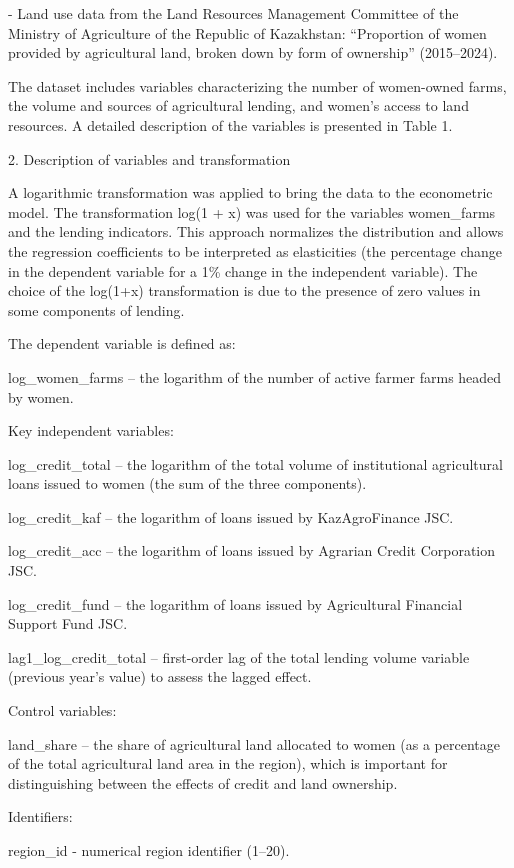 \documentclass[
]{article}
\begin{document}
- Land use data from the Land Resources Management Committee of the
Ministry of Agriculture of the Republic of Kazakhstan: ``Proportion of
women provided by agricultural land, broken down by form of ownership''
(2015--2024).

The dataset includes variables characterizing the number of women-owned
farms, the volume and sources of agricultural lending, and women's
access to land resources. A detailed description of the variables is
presented in Table 1.

2. Description of variables and transformation

A logarithmic transformation was applied to bring the data to the
econometric model. The transformation log(1 + x) was used for the
variables women\_farms and the lending indicators. This approach
normalizes the distribution and allows the regression coefficients to be
interpreted as elasticities (the percentage change in the dependent
variable for a 1\% change in the independent variable). The choice of
the log(1+x) transformation is due to the presence of zero values in
some components of lending.

The dependent variable is defined as:

log\_women\_farms -- the logarithm of the number of active farmer farms
headed by women.

Key independent variables:

log\_credit\_total -- the logarithm of the total volume of institutional
agricultural loans issued to women (the sum of the three components).

log\_credit\_kaf -- the logarithm of loans issued by KazAgroFinance JSC.

log\_credit\_acc -- the logarithm of loans issued by Agrarian Credit
Corporation JSC.

log\_credit\_fund -- the logarithm of loans issued by Agricultural
Financial Support Fund JSC.

lag1\_log\_credit\_total -- first-order lag of the total lending volume
variable (previous year's value) to assess the lagged effect.

Control variables:

land\_share -- the share of agricultural land allocated to women (as a
percentage of the total agricultural land area in the region), which is
important for distinguishing between the effects of credit and land
ownership.

Identifiers:

region\_id - numerical region identifier (1--20).
\end{document}
